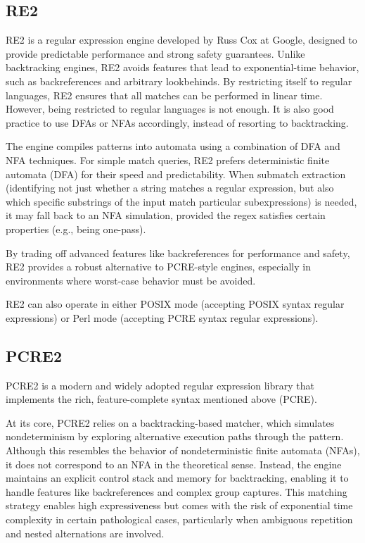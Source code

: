 \subsection{RE2}
RE2 is a regular expression engine developed by Russ Cox at Google, designed to provide predictable performance and strong safety guarantees. Unlike backtracking engines, RE2 avoids features that lead to exponential-time behavior, such as backreferences and arbitrary lookbehinds. 
By restricting itself to regular languages, RE2 ensures that all matches can be performed in linear time. \cite{russ_cox_regexp3}
However, being restricted to regular languages is not enough. It is also good practice to use DFAs or NFAs accordingly, instead of resorting to backtracking.

The engine compiles patterns into automata using a combination of DFA and NFA techniques. For simple match queries, RE2 prefers deterministic finite automata (DFA) for their speed and predictability. When submatch extraction (identifying not just whether a string matches a regular expression, but also which specific substrings of the input match particular subexpressions) is needed, it may fall back to an NFA simulation, provided the regex satisfies certain properties (e.g., being one-pass). \cite{russ_cox_regexp3}

By trading off advanced features like backreferences for performance and safety, RE2 provides a robust alternative to PCRE-style engines, especially in environments where worst-case behavior must be avoided.

RE2 can also operate in either POSIX mode (accepting POSIX syntax regular expressions) or Perl mode (accepting PCRE syntax regular expressions). \cite{russ_cox_re2}

\subsection{PCRE2}
PCRE2 is a modern and widely adopted regular expression library that implements the rich, feature-complete syntax mentioned above (PCRE). \cite{sw_pcre2}

At its core, PCRE2 relies on a backtracking-based matcher, which simulates nondeterminism by exploring alternative execution paths through the pattern. Although this resembles the behavior of nondeterministic finite automata (NFAs), it does not correspond to an NFA in the theoretical sense. Instead, the engine maintains an explicit control stack and memory for backtracking, enabling it to handle features like backreferences and complex group captures. This matching strategy enables high expressiveness but comes with the risk of exponential time complexity in certain pathological cases, particularly when ambiguous repetition and nested alternations are involved. \cite{sw_pcre2}

